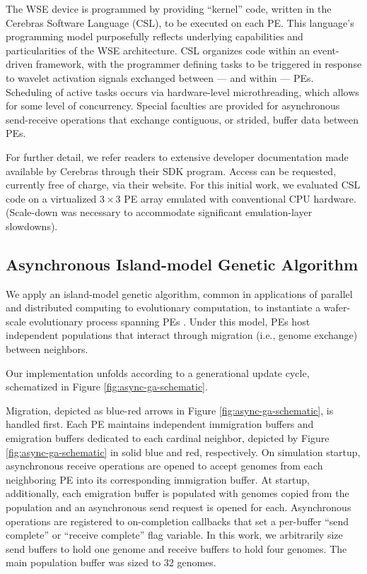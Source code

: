 The WSE device is programmed by providing ``kernel'' code, written in the Cerebras Software Language (CSL), to be executed on each PE.
This language's programming model purposefully reflects underlying capabilities and particularities of the WSE architecture.
CSL organizes code within an event-driven framework, with the programmer defining tasks to be triggered in response to wavelet activation signals exchanged between --- and within --- PEs.
Scheduling of active tasks occurs via hardware-level microthreading, which allows for some level of concurrency.
Special faculties are provided for asynchronous send-receive operations that exchange contiguous, or strided, buffer data between PEs.

For further detail, we refer readers to extensive developer documentation made available by Cerebras through their SDK program.
Access can be requested, currently free of charge, via their website.
For this initial work, we evaluated CSL code on a virtualized $3\times3$ PE array emulated with conventional CPU hardware.
(Scale-down was necessary to accommodate significant emulation-layer slowdowns).

\subsection{Asynchronous Island-model Genetic Algorithm}

We apply an island-model genetic algorithm, common in applications of parallel and distributed computing to evolutionary computation, to instantiate a wafer-scale evolutionary process spanning PEs \citep{bennett1999building}.
Under this model, PEs host independent populations that interact through migration (i.e., genome exchange) between neighbors.

Our implementation unfolds according to a generational update cycle, schematized in Figure \ref{fig:async-ga-schematic}.

Migration, depicted as blue-red arrows in Figure \ref{fig:async-ga-schematic}, is handled first.
Each PE maintains independent immigration buffers and emigration buffers dedicated to each cardinal neighbor, depicted by Figure \ref{fig:async-ga-schematic} in solid blue and red, respectively.
On simulation startup, asynchronous receive operations are opened to accept genomes from each neighboring PE into its corresponding immigration buffer.
At startup, additionally, each emigration buffer is populated with genomes copied from the population and an asynchronous send request is opened for each. %
Asynchronous operations are registered to on-completion callbacks that set a per-buffer ``send complete'' or ``receive complete'' flag variable.
In this work, we arbitrarily size send buffers to hold one genome and receive buffers to hold four genomes.
The main population buffer was sized to 32 genomes.

